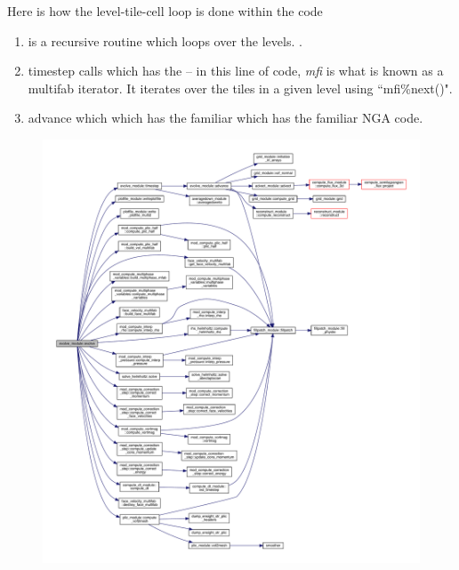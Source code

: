 \documentclass[11pt]{article}
\begin{document}
Here is how the level-tile-cell loop is done within the code
\begin{enumerate}
\item \href{https://github.com/nataraj2/MultiphaseAMReX/blob/master/amrex/Tutorials/Amr/MultiphaseAMR_LJCF/Source/evolve_mod.F90#L197}{} is a recursive routine which loops over 
the levels. \href{https://github.com/nataraj2/MultiphaseAMReX/blob/master/amrex/Tutorials/Amr/MultiphaseAMR_LJCF/Source/evolve_mod.F90#L248}{}.
\item timestep calls \href{https://github.com/nataraj2/MultiphaseAMReX/blob/master/amrex/Tutorials/Amr/MultiphaseAMR_LJCF/Source/evolve_mod.F90#L260}{} which has the 
\href{https://github.com/nataraj2/MultiphaseAMReX/blob/master/amrex/Tutorials/Amr/MultiphaseAMR_LJCF/Source/evolve_mod.F90#L343}{} -- in this line of code, 
\textit{mfi} is what is known as a multifab iterator. It 
iterates over the tiles in a given level using ``mfi\%next()".
\item advance \href{https://github.com/nataraj2/MultiphaseAMReX/blob/master/amrex/Tutorials/Amr/MultiphaseAMR_LJCF/Source/evolve_mod.F90#L426-L437}{} which 
\href{https://github.com/nataraj2/MultiphaseAMReX/blob/master/amrex/Tutorials/Amr/MultiphaseAMR_LJCF/Source/Src_3d/Adv_3d.f90#L111-L122}{} which has the familiar
\href{https://github.com/nataraj2/MultiphaseAMReX/blob/master/amrex/Tutorials/Amr/MultiphaseAMR_LJCF/Source/Src_3d/compute_flux_3d.f90#L87-L89}{} which has the familiar NGA code.
\end{enumerate}

\begin{figure}
\includegraphics[scale=0.5]{evolve_mod_full.pdf}
\end{figure}
\end{document}
